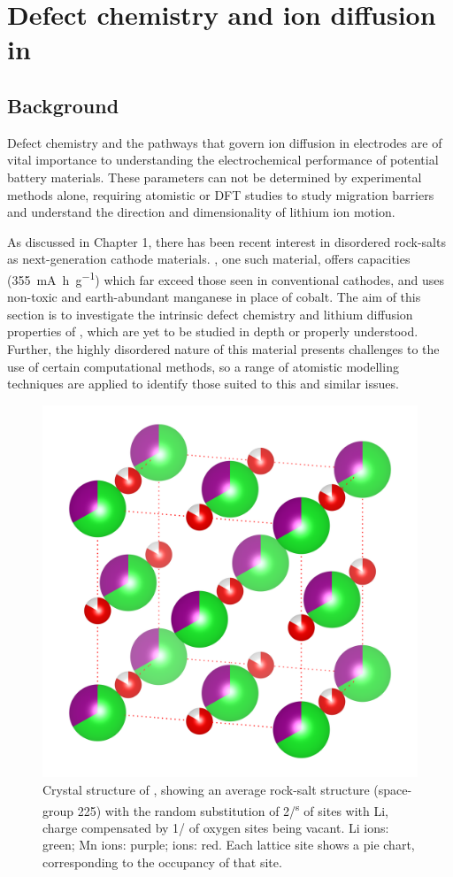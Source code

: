 \chapter{Defect chemistry and  ion diffusion in }
\section{Background}
Defect chemistry and the pathways that govern ion diffusion in electrodes are of vital importance to understanding the electrochemical performance of potential battery materials.
These parameters can not be determined by experimental methods alone, requiring atomistic or DFT studies to study migration barriers and understand the direction and dimensionality of lithium ion motion.

As discussed in Chapter 1, there has been recent interest in disordered rock-salts as next-generation cathode materials.
, one such material, offers capacities (\SI{355}{\milli\ampere\hour\per\gram}) which far exceed those seen in conventional cathodes, and uses non-toxic and earth-abundant manganese in place of cobalt.
The aim of this section is to investigate the intrinsic defect chemistry and lithium diffusion properties of , which are yet to be studied in depth or properly understood.
Further, the highly disordered nature of this material presents challenges to the use of certain computational methods, so a range of atomistic modelling techniques are applied to identify those suited to this and similar issues.

\newpage
\begin{figure}[h]
\centering
\vspace{1cm}
\includegraphics[width=0.4\linewidth]{figures/structures/Li4Mn2O5_compressed}
\caption[Crystal structure of ]{Crystal structure of , showing an average  rock-salt structure (space-group 225) with the random substitution of 2/\textsuperscript{s} of  sites with Li, charge compensated by 1/ of oxygen sites being vacant. Li ions: green; Mn ions: purple;  ions: red. Each lattice site shows a pie chart, corresponding to the occupancy of that site.}
\label{fig:Li4Mn2O5-average}
\end{figure}

